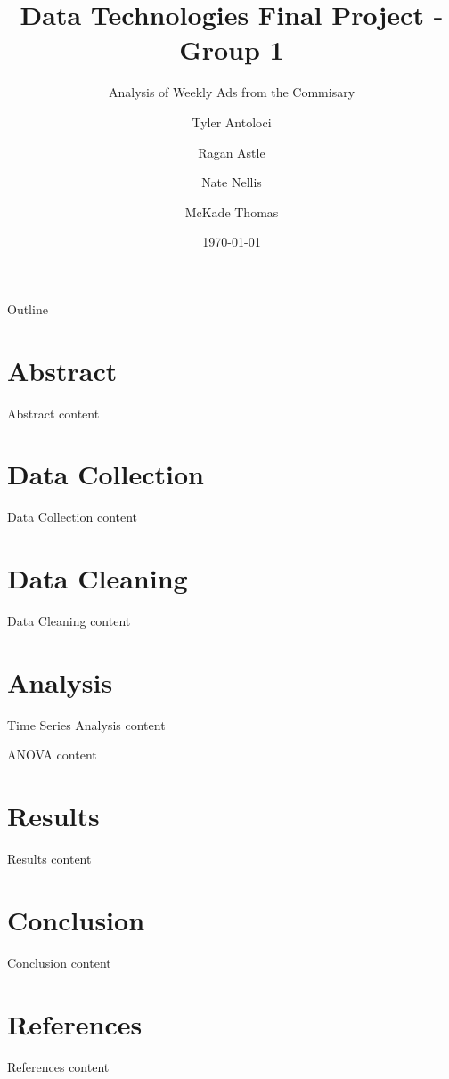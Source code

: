 \documentclass{beamer}
\title{Data Technologies Final Project - Group 1}
\subtitle{Analysis of Weekly Ads from the Commisary}
\author{Tyler Antoloci \and Ragan Astle \newline \and Nate Nellis \and McKade Thomas}
\institute{Utah State University}
\date{\today}
\begin{document}
\begin{frame}
    \titlepage
\end{frame}

\begin{frame}{Outline}
    \tableofcontents
\end{frame}

\section{Abstract}

    \begin{frame}{Abstract}
        content
    \end{frame}

\section{Data Collection}

    \begin{frame}{Data Collection}
        content
    \end{frame}

\section{Data Cleaning}

    \begin{frame}{Data Cleaning}
        content
    \end{frame}
 
\section{Analysis}

    \begin{frame}{Time Series Analysis}
        content
    \end{frame}

    \begin{frame}{ANOVA}
        content
    \end{frame}
 
\section{Results}

    \begin{frame}{Results}
        content
    \end{frame}
 
\section{Conclusion}

    \begin{frame}{Conclusion}
        content
    \end{frame}
 
\section{References}

     \begin{frame}{References}
        content
    \end{frame}
    
\end{document}
